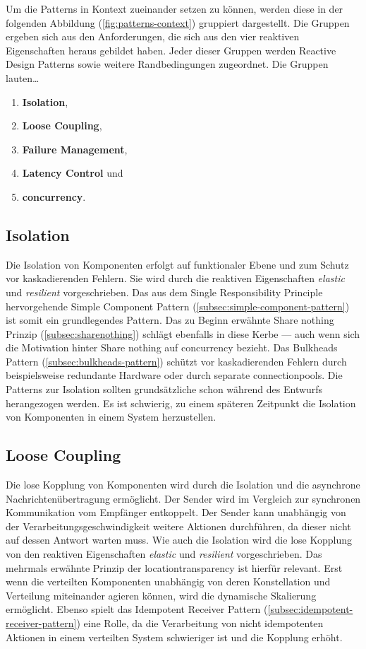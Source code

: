 Um die Patterns in Kontext zueinander setzen zu können, werden diese in der folgenden Abbildung (\ref{fig:patterns-context}) gruppiert dargestellt. Die Gruppen ergeben sich aus den Anforderungen, die sich aus den vier reaktiven Eigenschaften heraus gebildet haben. Jeder dieser Gruppen werden Reactive Design Patterns sowie weitere Randbedingungen zugeordnet. Die Gruppen lauten\ldots

\begin{enumerate}
  \item \textbf{Isolation},
  \item \textbf{Loose Coupling},
  \item \textbf{Failure Management},
  \item \textbf{Latency Control} und
  \item \textbf{\gls{concurrency}}.
\end{enumerate}

\pagebreak

\subsection{Isolation}
Die Isolation von Komponenten erfolgt auf funktionaler Ebene und zum Schutz vor kaskadierenden Fehlern. Sie wird durch die reaktiven Eigenschaften \textit{elastic} und \textit{resilient} vorgeschrieben. Das aus dem Single Responsibility Principle hervorgehende Simple Component Pattern (\ref{subsec:simple-component-pattern}) ist somit ein grundlegendes Pattern. Das zu Beginn erwähnte Share nothing Prinzip (\ref{subsec:sharenothing}) schlägt ebenfalls in diese Kerbe --- auch wenn sich die Motivation hinter Share nothing auf \gls{concurrency} bezieht. Das Bulkheads Pattern (\ref{subsec:bulkheads-pattern}) schützt vor kaskadierenden Fehlern durch beispielsweise redundante Hardware oder durch separate \glspl{connectionpool}. Die Patterns zur Isolation sollten grundsätzliche schon während des Entwurfs herangezogen werden. Es ist schwierig, zu einem späteren Zeitpunkt die Isolation von Komponenten in einem System herzustellen.

\subsection{Loose Coupling}
Die lose Kopplung von Komponenten wird durch die Isolation und die asynchrone Nachrichtenübertragung ermöglicht. Der Sender wird im Vergleich zur synchronen Kommunikation vom Empfänger entkoppelt. Der Sender kann unabhängig von der Verarbeitungsgeschwindigkeit weitere Aktionen durchführen, da dieser nicht auf dessen Antwort warten muss. Wie auch die Isolation wird die lose Kopplung von den reaktiven Eigenschaften \textit{elastic} und \textit{resilient} vorgeschrieben. Das mehrmals erwähnte Prinzip der \gls{locationtransparency} ist hierfür relevant. Erst wenn die verteilten Komponenten unabhängig von deren Konstellation und Verteilung miteinander agieren können, wird die dynamische Skalierung ermöglicht. Ebenso spielt das Idempotent Receiver Pattern (\ref{subsec:idempotent-receiver-pattern}) eine Rolle, da die Verarbeitung von nicht idempotenten Aktionen in einem verteilten System schwieriger ist und die Kopplung erhöht.

